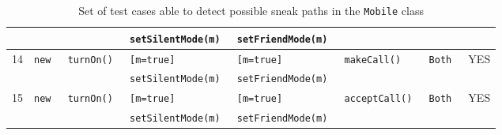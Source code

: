 \begin{table}[ht]
\begin{tabular}{|c|*{7}{l|}}
       &         &              & \tt setSilentMode(m) & \tt setFriendMode(m) &&& \\ \hline
    14 & \tt new & \tt turnOn() & \tt [m=true]         & \tt [m=true] & \tt makeCall() & \tt Both & YES \\
       &         &              & \tt setSilentMode(m) & \tt setFriendMode(m) &&& \\ \hline
    15 & \tt new & \tt turnOn() & \tt [m=true]         & \tt [m=true] & \tt acceptCall() & \tt Both & YES \\
       &         &              & \tt setSilentMode(m) & \tt setFriendMode(m) &&& \\ \hline
  \end{tabular}
  \caption[\texttt{Mobile} class sneak path test suite]
    {Set of test cases able to detect possible sneak paths in the
      \texttt{Mobile} class}
\end{table}
\clearpage